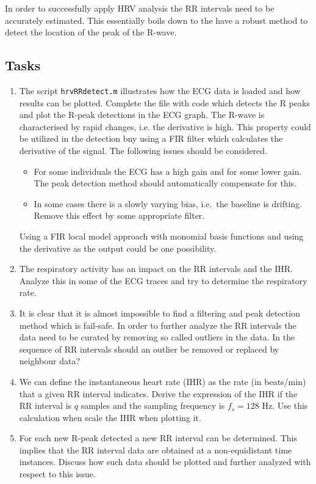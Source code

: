 \documentclass[12pt]{article}
\begin{document}
In order to successfully apply HRV analysis the RR intervals need to
be accurately estimated. This essentially boils down to the have a
robust method to detect the location of the peak of the R-wave.   

\subsection{Tasks}
\begin{enumerate}
\item The script \texttt{hrvRRdetect.m} illustrates how the ECG data
  is loaded and how results can be plotted. Complete the file with
  code which detects the R peaks and plot the R-peak detections in the
  ECG graph. The R-wave is characterised by rapid changes, i.e. the
  derivative is high. This property could be utilized in the detection
  bny using a FIR filter which calculates the derivative of the signal.  
  The following issues should be considered.
  \begin{itemize}
  \item For some individuals the ECG has a high gain and for some
    lower gain. The peak detection method should automatically
    compensate for this.
  \item In some cases there is a slowly varying bias, i.e.\ the
    baseline is drifting. Remove this effect by some appropriate filter.
  \end{itemize}
  Using a FIR local model approach with monomial basis functions and
  using the derivative as the output could be one possibility. 
\item The respiratory activity has an impact on the RR intervals and
  the IHR. Analyze this in some of the ECG traces and try to determine
  the respiratory rate.   
\item It is clear that it is almost impossible to find a filtering
  and peak detection method which is fail-safe. In order to further analyze
  the RR intervals the data need to be curated by removing so called
  outliers in the data. In the sequence of RR intervals should an
  outlier be removed or replaced by neighbour data?
\item We can define the instantaneous heart rate (IHR) as the rate (in
  beats/min) that a given RR interval indicates. Derive the
  expression of the IHR if the RR interval is $q$ samples and the
  sampling frequency is $f_s=128$ Hz. Use this calculation when
  scale the IHR when plotting it. 
\item For each new R-peak detected a new RR interval can be
  determined. This implies that the RR interval data are obtained at a
  non-equidistant time instances. Discuss how such data should be
  plotted and further analyzed with respect to this issue. 
\end{enumerate}
\end{document}

